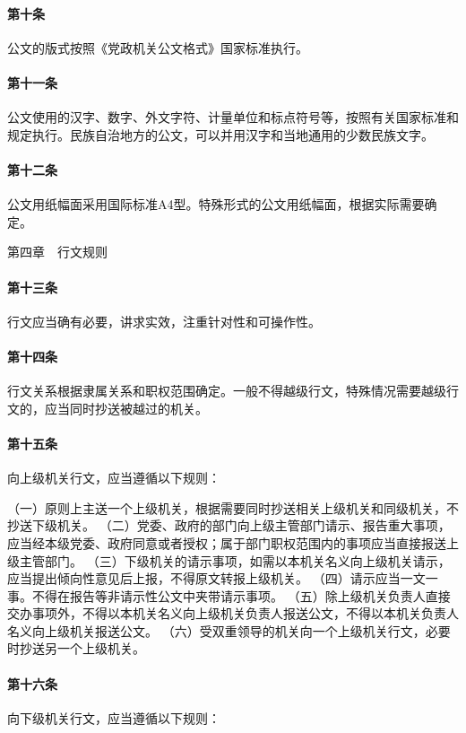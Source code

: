 \documentclass{gbt9704}
\begin{document}
\paragraph{第十条}
公文的版式按照《党政机关公文格式》国家标准执行。

\paragraph{第十一条}
公文使用的汉字、数字、外文字符、计量单位和标点符号等，按照有关国家标准和规定执行。民族自治地方的公文，可以并用汉字和当地通用的少数民族文字。

\paragraph{第十二条}
公文用纸幅面采用国际标准A4型。特殊形式的公文用纸幅面，根据实际需要确定。


第四章　行文规则


\paragraph{第十三条}
行文应当确有必要，讲求实效，注重针对性和可操作性。

\paragraph{第十四条}
行文关系根据隶属关系和职权范围确定。一般不得越级行文，特殊情况需要越级行文的，应当同时抄送被越过的机关。

\paragraph{第十五条}
向上级机关行文，应当遵循以下规则：

（一）原则上主送一个上级机关，根据需要同时抄送相关上级机关和同级机关，不抄送下级机关。
（二）党委、政府的部门向上级主管部门请示、报告重大事项，应当经本级党委、政府同意或者授权；属于部门职权范围内的事项应当直接报送上级主管部门。
（三）下级机关的请示事项，如需以本机关名义向上级机关请示，应当提出倾向性意见后上报，不得原文转报上级机关。
（四）请示应当一文一事。不得在报告等非请示性公文中夹带请示事项。
（五）除上级机关负责人直接交办事项外，不得以本机关名义向上级机关负责人报送公文，不得以本机关负责人名义向上级机关报送公文。
（六）受双重领导的机关向一个上级机关行文，必要时抄送另一个上级机关。
\paragraph{第十六条}
向下级机关行文，应当遵循以下规则：
\end{document}
